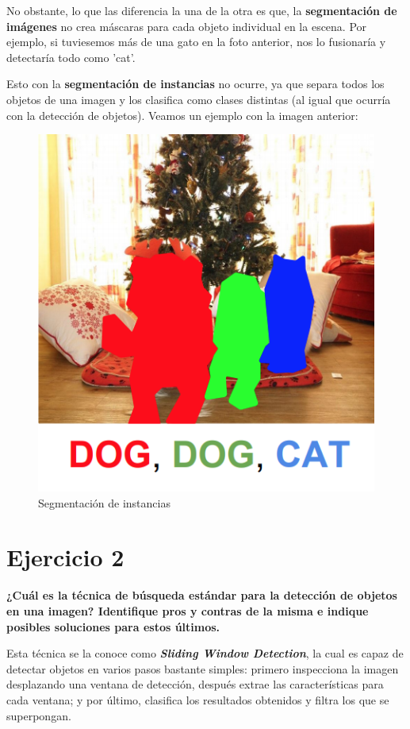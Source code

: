 \documentclass[11pt,a4paper]{article}
\begin{document}
No obstante, lo que las diferencia la una de la otra es que, la \textbf{segmentación de imágenes} no crea máscaras para cada objeto individual en la escena. Por
ejemplo, si tuviesemos más de una gato en la foto anterior, nos lo fusionaría y detectaría todo como 'cat'.

Esto con la \textbf{segmentación de instancias} no ocurre, ya que separa todos los objetos de una imagen y los clasifica como clases distintas (al igual que ocurría
con la detección de objetos). Veamos un ejemplo con la imagen anterior:
\begin{figure}[H]
\centering
\includegraphics[scale=0.5]{img/image_segmentation.png}
\caption{Segmentación de instancias}
\end{figure}


\section*{Ejercicio 2}

\textbf{¿Cuál es la técnica de búsqueda estándar para la detección de objetos en una imagen? Identifique pros y contras de la misma e indique
posibles soluciones para estos últimos.}

Esta técnica se la conoce como \textbf{\textit{Sliding Window Detection}}, la cual es capaz de detectar objetos en varios pasos bastante simples: primero
inspecciona la imagen desplazando una ventana de detección, después extrae las características para cada ventana; y por último, clasifica los resultados
obtenidos y filtra los que se superpongan.
\end{document}
